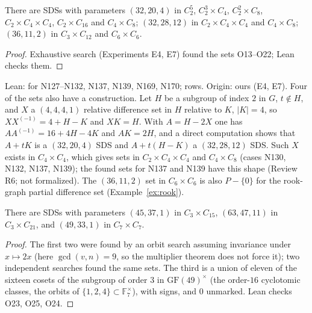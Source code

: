 \begin{theorem}\label{thm:z12}
There are SDSs with parameters $(32, 20, 4)$ in $C_2^5$, $C_2^3 \times C_4$,
$C_2^2 \times C_8$, $C_2 \times C_4 \times C_4$, $C_2 \times C_{16}$ and $C_4 \times C_8$;
$(32, 28, 12)$ in $C_2 \times C_4 \times C_4$ and $C_4 \times C_8$; $(36, 11, 2)$ in
$C_3 \times C_{12}$ and $C_6 \times C_6$.
\end{theorem}

\begin{proof}
Exhaustive search (Experiments E4, E7) found the sets O13--O22; Lean checks them.
\end{proof}

\begin{remark}
Lean:  for N127--N132, N137, N139, N169, N170;  rows.
Origin: ours (E4, E7). Four of the sets also have a construction. Let $H$ be a subgroup of index
$2$ in $G$, $t \notin H$, and $X$ a $(4, 4, 4, 1)$ relative difference set in $H$ relative to
$K$, $|K| = 4$, so $XX^{(-1)} = 4 + H - K$ and $XK = H$. With $A = H - 2X$ one has
$AA^{(-1)} = 16 + 4H - 4K$ and $AK = 2H$, and a direct computation shows that $A + tK$ is a
$(32, 20, 4)$ SDS and $A + t(H - K)$ a $(32, 28, 12)$ SDS. Such $X$ exists in
$C_4 \times C_4$, which gives sets in $C_2 \times C_4 \times C_4$ and $C_4 \times C_8$ (cases
N130, N132, N137, N139); the found sets for N137 and N139 have this shape (Review R6; not
formalized). The $(36, 11, 2)$ set in $C_6 \times C_6$ is also $P - \{0\}$ for the rook-graph
partial difference set (Example~\ref{ex:rook}).
\end{remark}

\begin{theorem}\label{thm:z13}
There are SDSs with parameters $(45, 37, 1)$ in $C_3 \times C_{15}$, $(63, 47, 11)$ in
$C_3 \times C_{21}$, and $(49, 33, 1)$ in $C_7 \times C_7$.
\end{theorem}

\begin{proof}
The first two were found by an orbit search assuming invariance under $x \mapsto 2x$ (here
$\gcd(v, n) = 9$, so the multiplier theorem does not force it); two independent searches found
the same sets. The third is a union of eleven of the sixteen cosets of the subgroup of order $3$
in $\mathrm{GF}(49)^\times$ (the order-$16$ cyclotomic classes, the orbits of
$\{1, 2, 4\} \subset \mathbb{F}_7^\times$), with signs, and $0$ unmarked. Lean checks O23, O25,
O24.
\end{proof}

